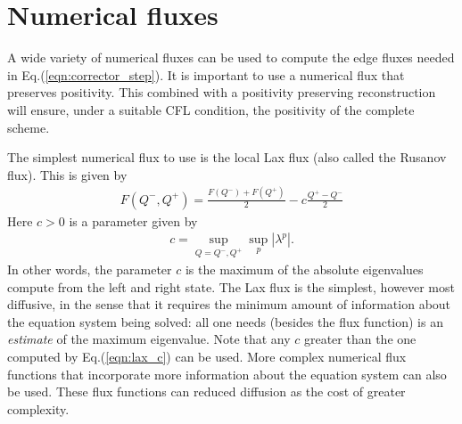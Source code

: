 \documentclass[11pt, reqno]{amsart}
\newcommand{\eqr}[1]{Eq.\thinspace(#1)}
\theoremstyle{definition}
\begin{document}
\section{Numerical fluxes}

A wide variety of numerical fluxes can be used to compute the edge
fluxes needed in \eqr{\ref{eqn:corrector_step}}. It is important to
use a numerical flux that preserves positivity. This combined with a
positivity preserving reconstruction will ensure, under a suitable CFL
condition, the positivity of the complete scheme.

The simplest numerical flux to use is the local Lax flux (also called
the Rusanov flux). This is given by
\begin{align}
  F(Q^-,Q^+) = \frac{F(Q^-) + F(Q^+)}{2} - c\frac{Q^+- Q^-}{2}
\end{align}
Here $c>0$ is a parameter given by
\begin{align}
  c = \sup_{Q=Q^-,Q^+} \sup_p | \lambda^p |. \label{eqn:lax_c}
\end{align}
In other words, the parameter $c$ is the maximum of the absolute
eigenvalues compute from the left and right state. The Lax flux is the
simplest, however most diffusive, in the sense that it requires the
minimum amount of information about the equation system being solved:
all one needs (besides the flux function) is an \emph{estimate} of the
maximum eigenvalue. Note that any $c$ greater than the one computed by
\eqr{\ref{eqn:lax_c}} can be used. More complex numerical flux
functions that incorporate more information about the equation system
can also be used. These flux functions can reduced diffusion as the
cost of greater complexity.
\end{document}
